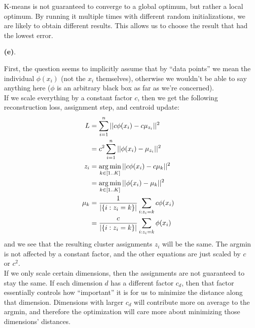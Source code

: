 \documentclass[11pt]{article}
\begin{document}
K-means is not guaranteed to converge to a global optimum, but rather a local optimum. By running it multiple times with different random initializations, we are likely to obtain different results. This allows us to choose the result that had the lowest error. 


\clearpage
\textbf{(e)}. 

First, the question seems to implicitly assume that by ``data points'' we mean the individual $\phi(x_i)$ (not the $x_i$ themselves), otherwise we wouldn't be able to say anything here ($\phi$ is an arbitrary black box as far as we're concerned). \\

If we scale everything by a constant factor $c$, then we get the following reconstruction loss, assignment step, and centroid update:
\begin{align}
	L &= \sum_{i=1}^{n} || c \phi(x_i) - c \mu_{z_i} ||^2 \\
		&= c^2  \sum_{i=1}^{n} ||  \phi(x_i) - \mu_{z_i} ||^2 \\
	z_i &= \operatorname*{arg\,min}_{k \in [1..K]} || c \phi(x_i) - c \mu_{k} ||^2 \\
		&= \operatorname*{arg\,min}_{k \in [1..K]} || \phi(x_i) -  \mu_{k} ||^2 \\
	\mu_k &= \frac{1}{| \{ i: z_i=k  \} |} \sum_{i: z_i=k} c \phi(x_i) \\
		&= \frac{c}{| \{ i: z_i=k  \} |} \sum_{i: z_i=k}  \phi(x_i)
\end{align}
and we see that the resulting cluster assignments $z_i$ will be the same. The argmin is not affected by a constant factor, and the other equations are just scaled by $c$ or $c^2$. \\

If we only scale certain dimensions, then the assignments are not guaranteed to stay the same. If each dimension $d$ has a different factor $c_d$, then that factor essentially controls how ``important'' it is for us to minimize the distance along that dimension. Dimensions with larger $c_d$ will contribute more on average to the argmin, and therefore the optimization will care more about minimizing those dimensions' distances. 
\end{document}
